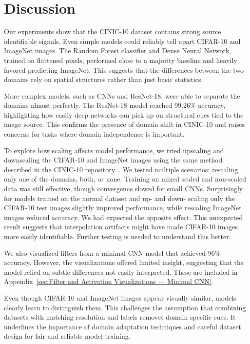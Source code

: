 \section{Discussion}

Our experiments show that the CINIC-10 dataset contains strong source identifiable signals. Even simple models could reliably tell apart CIFAR-10 
and ImageNet images. The Random Forest classifier and Dense Neural Network, trained on flattened pixels, performed close to a majority baseline and 
heavily favored predicting ImageNet. This suggests that the differences between the two domains rely on spatial structures rather than just basic 
statistics.

More complex models, such as CNNs and ResNet-18, were able to separate the domains almost perfectly. The ResNet-18 model reached 99.26\% accuracy, 
highlighting how easily deep networks can pick up on structural cues tied to the image source. This confirms the presence of domain shift in 
CINIC-10 and raises concerns for tasks where domain independence is important.

To explore how scaling affects model performance, we tried upscaling and downscaling the CIFAR-10 and ImageNet images using the same method 
described in the CINIC-10 repository~\cite{cinic10_github}. We tested multiple scenarios: rescaling only one of the domains, both, or none. 
Training on mixed scaled and non-scaled data was still effective, though convergence slowed for small CNNs. Surprisingly for models trained on the 
normal dataset and up- and down- scaling only the CIFAR-10 test images slightly improved performance, while rescaling ImageNet images reduced 
accuracy. We had expected the opposite effect. This unexpected result suggests that interpolation artifacts might have made CIFAR-10 images more 
easily identifiable. Further testing is needed to understand this better.

We also visualized filters from a minimal CNN model that achieved 96\% accuracy. However, the visualizations offered limited insight, suggesting 
that the model relied on subtle differences not easily interpreted. These are included in 
Appendix~\ref{sec:Filter and Activation Visualizations — Minimal CNN}.

Even though CIFAR-10 and ImageNet images appear visually similar, models clearly learn to distinguish them. This challenges the assumption that 
combining datasets with matching resolution and labels removes domain specific cues. It underlines the importance of domain adaptation techniques 
and careful dataset design for fair and reliable model training.